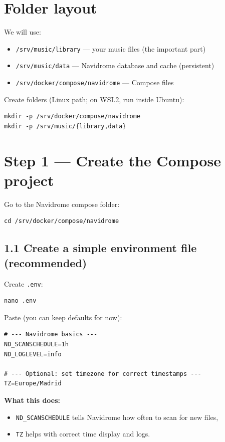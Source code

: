 \section{Folder layout}
We will use:
\begin{itemize}[leftmargin=*]
  \item \texttt{/srv/music/library} --- your music files (the important part)
  \item \texttt{/srv/music/data} --- Navidrome database and cache (persistent)
  \item \texttt{/srv/docker/compose/navidrome} --- Compose files
\end{itemize}

Create folders (Linux path; on WSL2, run inside Ubuntu):

\begin{lstlisting}
mkdir -p /srv/docker/compose/navidrome
mkdir -p /srv/music/{library,data}
\end{lstlisting}


\section{Step 1 --- Create the Compose project}
Go to the Navidrome compose folder:

\begin{lstlisting}
cd /srv/docker/compose/navidrome
\end{lstlisting}

\subsection{1.1 Create a simple environment file (recommended)}
Create \texttt{.env}:

\begin{lstlisting}
nano .env
\end{lstlisting}

Paste (you can keep defaults for now):

\begin{lstlisting}
# --- Navidrome basics ---
ND_SCANSCHEDULE=1h
ND_LOGLEVEL=info

# --- Optional: set timezone for correct timestamps ---
TZ=Europe/Madrid
\end{lstlisting}

\textbf{What this does:}
\begin{itemize}[leftmargin=*]
  \item \texttt{ND\_SCANSCHEDULE} tells Navidrome how often to scan for new files,
  \item \texttt{TZ} helps with correct time display and logs.
\end{itemize}

